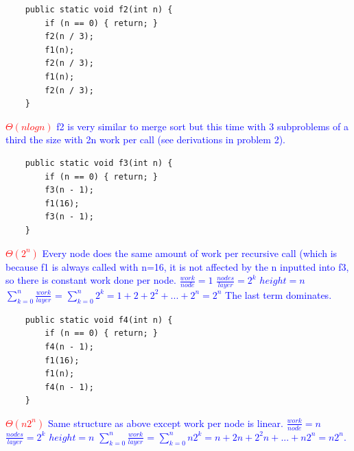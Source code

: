 \documentclass[11pt,letterpaper]{article}
\begin{document}
\begin{lstlisting}
    public static void f2(int n) {
        if (n == 0) { return; }
        f2(n / 3);
        f1(n);
        f2(n / 3);
        f1(n);
        f2(n / 3);
    }
\end{lstlisting}
\textcolor{red}{$\Theta(nlogn)$}
\newline
\textcolor{blue}{f2 is very similar to merge sort but this time with 3 subproblems of a third the size with 2n work per call (see derivations in problem 2).}
\newline

\begin{lstlisting}
    public static void f3(int n) {
        if (n == 0) { return; }
        f3(n - 1);
        f1(16);
        f3(n - 1);
    }
\end{lstlisting}
\textcolor{red}{$\Theta(2^n)$}
\newline
\textcolor{blue}{Every node does the same amount of work per recursive call (which is because f1 is always called with n=16, it is not affected by the n inputted into f3, so there is constant work done per node.  
\newline
\newline
$\frac{work}{node} = 1$
\newline
\newline
$\frac{nodes}{layer} = 2^k$
\newline
\newline
$height = n$
\newline
\newline
$\sum_{k=0}^{n}\frac{work}{layer}$ = $\sum_{k=0}^{n}2^k = 1 + 2 + 2^2 + ... + 2^n = 2^n$ The last term dominates.  
}

\newpage
\begin{lstlisting}
    public static void f4(int n) {
        if (n == 0) { return; }
        f4(n - 1);
        f1(16);
        f1(n);
        f4(n - 1);
    }
\end{lstlisting}
\textcolor{red}{$\Theta(n2^n)$}
\newline
\textcolor{blue}{Same structure as above except work per node is linear.
\newline
\newline
$\frac{work}{node} = n$
\newline
\newline
$\frac{nodes}{layer} = 2^k$
\newline
\newline
$height = n$
\newline
\newline
$\sum_{k=0}^{n}\frac{work}{layer}$ = $\sum_{k=0}^{n}n2^k = n + 2n + 2^2n + ... + n2^n = n2^n$.
\newline}
\end{document}
